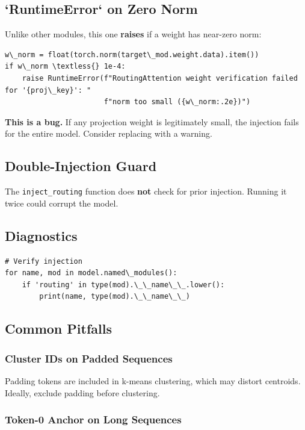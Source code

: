 \subsection{`RuntimeError` on Zero Norm}

Unlike other modules, this one \textbf{raises} if a weight has near-zero norm:

\begin{lstlisting}
w\_norm = float(torch.norm(target\_mod.weight.data).item())
if w\_norm \textless{} 1e-4:
    raise RuntimeError(f"RoutingAttention weight verification failed for '{proj\_key}': "
                       f"norm too small ({w\_norm:.2e})")
\end{lstlisting}

\textbf{This is a bug.} If any projection weight is legitimately small, the 
injection fails for the entire model. Consider replacing with a warning.

\subsection{Double-Injection Guard}

The \texttt{inject\_routing} function does \textbf{not} check for prior injection. Running 
it twice could corrupt the model.

\subsection{Diagnostics}

\begin{lstlisting}
# Verify injection
for name, mod in model.named\_modules():
    if 'routing' in type(mod).\_\_name\_\_.lower():
        print(name, type(mod).\_\_name\_\_)
\end{lstlisting}

\subsection{Common Pitfalls}

\subsubsection{Cluster IDs on Padded Sequences}

Padding tokens are included in k-means clustering, which may distort 
centroids. Ideally, exclude padding before clustering.

\subsubsection{Token-0 Anchor on Long Sequences}


